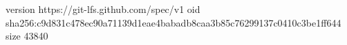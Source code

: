version https://git-lfs.github.com/spec/v1
oid sha256:c9d831c478ec90a71139d1eae4babadb8caa3b85c76299137c0410c3be1ff644
size 43840
